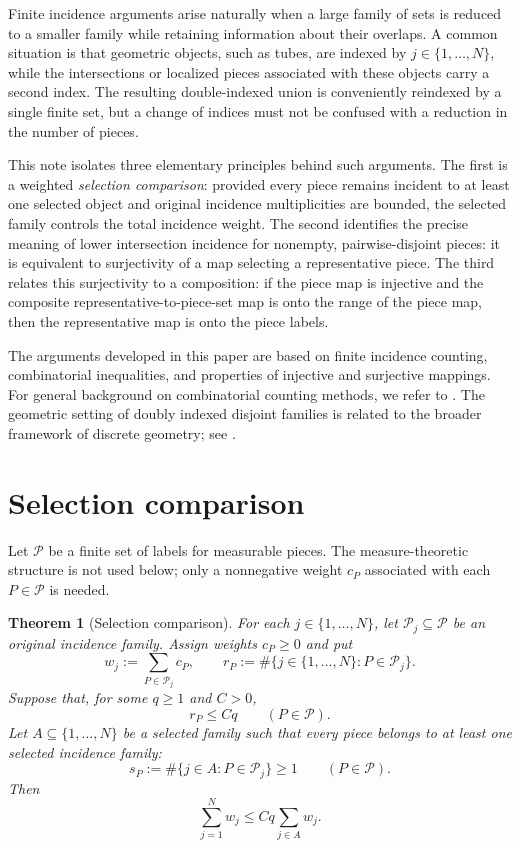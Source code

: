\documentclass[11pt, letterpaper]{nyjm}
\newtheorem{theorem}{Theorem}[section]
\newcommand{\calP}{\mathcal{P}}
\begin{document}
	Finite incidence arguments arise naturally when a large family of sets is
	reduced to a smaller family while retaining information about their
	overlaps. A common situation is that geometric objects, such as tubes,
	are indexed by $j\in\{1,\ldots,N\}$, while the intersections or localized
	pieces associated with these objects carry a second index.  The resulting
	double-indexed union is conveniently reindexed by a single finite set,
	but a change of indices must not be confused with a reduction in the
	number of pieces.
	
	This note isolates three elementary principles behind such arguments.
	The first is a weighted \emph{selection comparison}: provided every
	piece remains incident to at least one selected object and original
	incidence multiplicities are bounded, the selected family controls the
	total incidence weight. The second identifies the precise meaning of
	lower intersection incidence for nonempty, pairwise-disjoint pieces:
	it is equivalent to surjectivity of a map selecting a representative
	piece. The third relates this surjectivity to a composition: if the
	piece map is injective and the composite representative-to-piece-set
	map is onto the range of the piece map, then the representative map is
	onto the piece labels.
	
	The arguments developed in this paper are based on
	finite incidence counting, combinatorial inequalities,
	and properties of injective and surjective mappings.
	For general background on combinatorial counting
	methods, we refer to \cite{vanLintWilson}.
	The geometric setting of doubly indexed disjoint
	families is related to the broader framework of
	discrete geometry; see \cite{Matousek}.
	
	\section{Selection comparison}
	
	Let $\calP$ be a finite set of labels for measurable pieces. The
	measure-theoretic structure is not used below; only a nonnegative weight
	$c_P$ associated with each $P\in\calP$ is needed.
	
	\begin{theorem}[Selection comparison]\label{thm:comparison}
		For each $j\in\{1,\ldots,N\}$, let $\calP_j\subseteq\calP$ be an
		original incidence family. Assign weights $c_P\geq 0$ and put
		\[
		w_j:=\sum_{P\in\calP_j}c_P,
		\qquad
		r_P:=\#\bigl\{j\in\{1,\ldots,N\}:P\in\calP_j\bigr\}.
		\]
		Suppose that, for some $q\geq1$ and $C>0$,
		\[
		r_P\leq Cq\qquad(P\in\calP).
		\]
		Let $A\subseteq\{1,\ldots,N\}$ be a selected family such that every
		piece belongs to at least one selected incidence family:
		\[
		s_P:=\#\{j\in A:P\in\calP_j\}\geq1
		\qquad(P\in\calP).
		\]
		Then
		\begin{equation}\label{eq:selection-comparison}
			\boxed{\displaystyle
				\sum_{j=1}^{N}w_j\leq Cq\sum_{j\in A}w_j.}
		\end{equation}
	\end{theorem}
	
\end{document}
